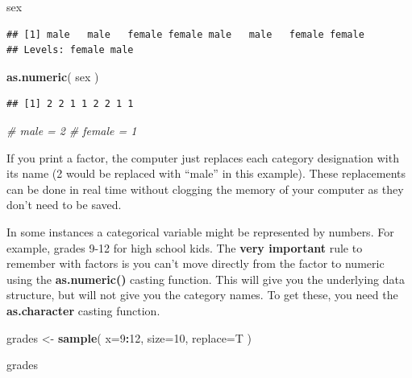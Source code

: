 \documentclass[]{book}
\newenvironment{Shaded}{\begin{snugshade}}{\end{snugshade}}
\newcommand{\CommentTok}[1]{\textcolor[rgb]{0.56,0.35,0.01}{\textit{#1}}}
\newcommand{\DataTypeTok}[1]{\textcolor[rgb]{0.13,0.29,0.53}{#1}}
\newcommand{\DecValTok}[1]{\textcolor[rgb]{0.00,0.00,0.81}{#1}}
\newcommand{\KeywordTok}[1]{\textcolor[rgb]{0.13,0.29,0.53}{\textbf{#1}}}
\newcommand{\NormalTok}[1]{#1}
\newcommand{\OperatorTok}[1]{\textcolor[rgb]{0.81,0.36,0.00}{\textbf{#1}}}
\newcommand{\StringTok}[1]{\textcolor[rgb]{0.31,0.60,0.02}{#1}}
\theoremstyle{definition}
\theoremstyle{definition}
\theoremstyle{definition}
\theoremstyle{remark}
\begin{document}
\begin{Shaded}
\begin{Highlighting}[]
\NormalTok{sex}
\end{Highlighting}
\end{Shaded}

\begin{verbatim}
## [1] male   male   female female male   male   female female
## Levels: female male
\end{verbatim}

\begin{Shaded}
\begin{Highlighting}[]
\KeywordTok{as.numeric}\NormalTok{( sex )}
\end{Highlighting}
\end{Shaded}

\begin{verbatim}
## [1] 2 2 1 1 2 2 1 1
\end{verbatim}

\begin{Shaded}
\begin{Highlighting}[]
\CommentTok{#  male = 2}
\CommentTok{#  female = 1}
\end{Highlighting}
\end{Shaded}

If you print a factor, the computer just replaces each category
designation with its name (2 would be replaced with ``male'' in this
example). These replacements can be done in real time without clogging
the memory of your computer as they don't need to be saved.

In some instances a categorical variable might be represented by
numbers. For example, grades 9-12 for high school kids. The \textbf{very
important} rule to remember with factors is you can't move directly from
the factor to numeric using the \textbf{as.numeric()} casting function.
This will give you the underlying data structure, but will not give you
the category names. To get these, you need the \textbf{as.character}
casting function.

\begin{Shaded}
\begin{Highlighting}[]
\NormalTok{grades <-}\StringTok{ }\KeywordTok{sample}\NormalTok{( }\DataTypeTok{x=}\DecValTok{9}\OperatorTok{:}\DecValTok{12}\NormalTok{, }\DataTypeTok{size=}\DecValTok{10}\NormalTok{, }\DataTypeTok{replace=}\NormalTok{T )}

\NormalTok{grades}
\end{Highlighting}
\end{Shaded}
\end{document}
